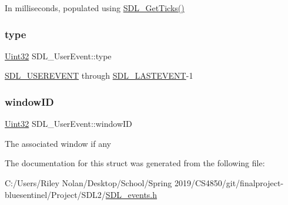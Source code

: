 In milliseconds, populated using \mbox{\hyperlink{_s_d_l__timer_8h_a0b9bc71d6287e0ffafdc3419760fe2b3}{S\+D\+L\+\_\+\+Get\+Ticks()}} \mbox{\label{struct_s_d_l___user_event_ab7afa8b98dbd7b52bef41155e10f7340}} 
\subsubsection{\texorpdfstring{type}{type}}
{\footnotesize\ttfamily \mbox{\hyperlink{_s_d_l__stdinc_8h_add440eff171ea5f55cb00c4a9ab8672d}{Uint32}} S\+D\+L\+\_\+\+User\+Event\+::type}

\mbox{\hyperlink{_s_d_l__events_8h_a3b589e89be6b35c02e0dd34a55f3fccaa4364c23f54802309e83fdb9b1c07c719}{S\+D\+L\+\_\+\+U\+S\+E\+R\+E\+V\+E\+NT}} through \mbox{\hyperlink{_s_d_l__events_8h_a3b589e89be6b35c02e0dd34a55f3fccaaffeac40a4ff366717c0ebc74118ea2ae}{S\+D\+L\+\_\+\+L\+A\+S\+T\+E\+V\+E\+NT}}-\/1 \mbox{\label{struct_s_d_l___user_event_abccefa10e0e0e3a0801bc6d836a08da7}} 
\subsubsection{\texorpdfstring{windowID}{windowID}}
{\footnotesize\ttfamily \mbox{\hyperlink{_s_d_l__stdinc_8h_add440eff171ea5f55cb00c4a9ab8672d}{Uint32}} S\+D\+L\+\_\+\+User\+Event\+::window\+ID}

The associated window if any 

The documentation for this struct was generated from the following file\+:\begin{DoxyCompactItemize}
\item 
C\+:/\+Users/\+Riley Nolan/\+Desktop/\+School/\+Spring 2019/\+C\+S4850/git/finalproject-\/bluesentinel/\+Project/\+S\+D\+L2/\mbox{\hyperlink{_s_d_l__events_8h}{S\+D\+L\+\_\+events.\+h}}\end{DoxyCompactItemize}
